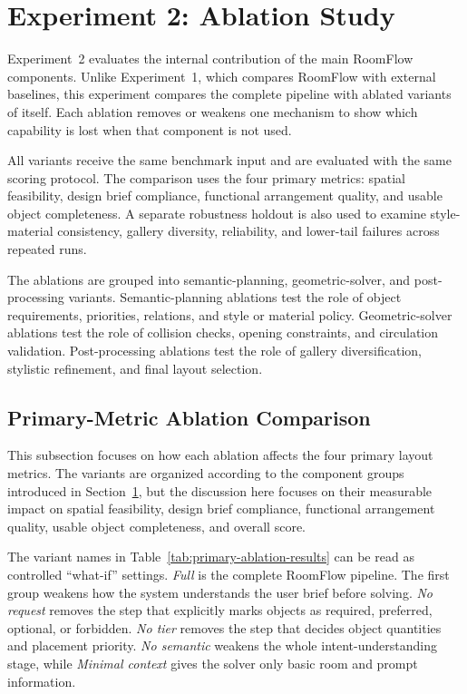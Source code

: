\clearpage
\section{Experiment 2: Ablation Study}\label{subsec:eval-layout-ablation}

Experiment~2 evaluates the internal contribution of the main RoomFlow components. Unlike Experiment~1, which compares RoomFlow with external baselines, this experiment compares the complete pipeline with ablated variants of itself. Each ablation removes or weakens one mechanism to show which capability is lost when that component is not used.

All variants receive the same benchmark input and are evaluated with the same scoring protocol. The comparison uses the four primary metrics: spatial feasibility, design brief compliance, functional arrangement quality, and usable object completeness. A separate robustness holdout is also used to examine style-material consistency, gallery diversity, reliability, and lower-tail failures across repeated runs.

The ablations are grouped into semantic-planning, geometric-solver, and post-processing variants. Semantic-planning ablations test the role of object requirements, priorities, relations, and style or material policy. Geometric-solver ablations test the role of collision checks, opening constraints, and circulation validation. Post-processing ablations test the role of gallery diversification, stylistic refinement, and final layout selection.

\subsection{Primary-Metric Ablation Comparison}

This subsection focuses on how each ablation affects the four primary layout metrics. The variants are organized according to the component groups introduced in Section~\ref{subsec:eval-layout-ablation}, but the discussion here focuses on their measurable impact on spatial feasibility, design brief compliance, functional arrangement quality, usable object completeness, and overall score.

The variant names in Table~\ref{tab:primary-ablation-results} can be read as controlled ``what-if'' settings. \textit{Full} is the complete RoomFlow pipeline. The first group weakens how the system understands the user brief before solving. \textit{No request} removes the step that explicitly marks objects as required, preferred, optional, or forbidden. \textit{No tier} removes the step that decides object quantities and placement priority. \textit{No semantic} weakens the whole intent-understanding stage, while \textit{Minimal context} gives the solver only basic room and prompt information.

